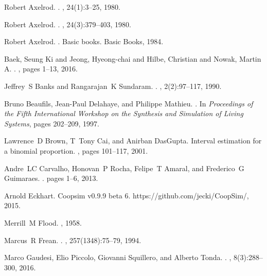 \documentclass[10pt,letterpaper]{article}
\begin{document}
\begin{thebibliography}{10}
Robert Axelrod.
.
, 24(1):3--25, 1980.

Robert Axelrod.
.
, 24(3):379--403, 1980.

Robert Axelrod.
.
\newblock Basic books. Basic Books, 1984.

{Baek, Seung Ki and Jeong, Hyeong-chai and Hilbe, Christian and Nowak, Martin
  A}.
.
, pages 1--13, 2016.

Jeffrey~S Banks and Rangarajan~K Sundaram.
.
, 2(2):97--117, 1990.

Bruno Beaufils, Jean-Paul Delahaye, and Philippe Mathieu.
.
\newblock In {\em Proceedings of the Fifth International Workshop on the
  Synthesis and Simulation of Living Systems}, pages 202--209, 1997.

Lawrence~D Brown, T~Tony Cai, and Anirban DasGupta.
\newblock Interval estimation for a binomial proportion.
, pages 101--117, 2001.

Andre~LC Carvalho, Honovan~P Rocha, Felipe~T Amaral, and Frederico~G Guimaraes.
.
\newblock pages 1--6, 2013.

Arnold Eckhart.
\newblock Coopsim v0.9.9 beta 6.
\newblock https://github.com/jecki/CoopSim/, 2015.

Merrill~M Flood.
, 1958.

Marcus~R Frean.
.
, 257(1348):75--79, 1994.

Marco Gaudesi, Elio Piccolo, Giovanni Squillero, and Alberto Tonda.
.
, 8(3):288--300, 2016.


\end{thebibliography}
\end{document}
